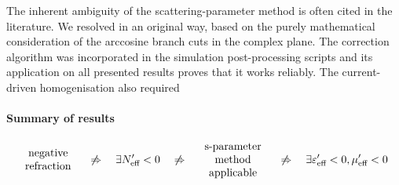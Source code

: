 The inherent ambiguity of the scattering-parameter method is often cited in the literature. We resolved in an original way, based on the purely mathematical consideration of the arccosine branch cuts in the complex plane. The correction algorithm was incorporated in the simulation post-processing scripts and its application on all presented results proves that it works reliably. The current-driven homogenisation also required 




\paragraph{Summary of results}





\begin{equation}
\begin{array}{c} \text{negative}\\ \text{refraction} \end{array}
\quad\not\Rightarrow\quad  \exists N_{\text{eff} }' < 0 
\quad\not\Rightarrow\quad \begin{array}{c} \text{s-parameter}\\ \text{method}\\ \text{applicable}  \end{array}
\quad\not\Rightarrow\quad \exists \varepsilon_{\text{eff} }'<0, \mu_{\text{eff} }'<0  
\label{eq_implications}\end{equation} %


